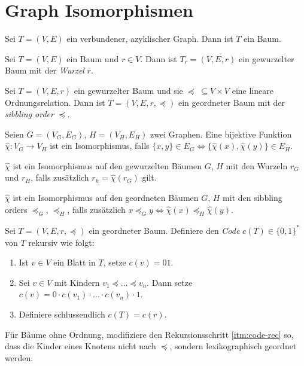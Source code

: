 \chapter{Graph Isomorphismen}

\begin{definition}[Baum]
    Sei $ T = (V, E) $ ein verbundener, azyklischer Graph.
    Dann ist $ T $ ein Baum.
\end{definition}

\begin{definition}
    Sei $ T = (V, E) $ ein Baum und $ r \in V $.
    Dann ist $ T_r = (V, E, r) $ ein gewurzelter Baum mit der \textit{Wurzel} $ r $.
\end{definition}

\begin{definition}
    Sei $ T = (V, E, r) $ ein gewurzelter Baum und sie $ \preceq \; \subseteq V \times V $ eine lineare Ordnungsrelation.
    Dann ist $ T = (V, E, r, \preceq) $ ein geordneter Baum mit der \textit{sibbling order} $ \preceq $.
\end{definition}

\begin{definition}
    Seien $ G = (V_G, E_G) $, $ H = (V_H, E_H) $ zwei Graphen.
    Eine bijektive Funktion $ \hat{\chi} : V_G \rightarrow V_H $ ist ein Isomorphismus, falls $ \{ x, y \} \in E_G \Leftrightarrow \{ \hat{\chi}(x), \hat{\chi}(y) \} \in E_H $.

    $ \hat\chi $ ist ein Isomorphismus auf den gewurzelten Bäumen $ G $, $ H $ mit den Wurzeln $ r_G $ und $ r_H $, falls zusätzlich $ r_h = \hat\chi(r_G) $ gilt.

    $ \hat\chi $ ist ein Isomorphismus auf den geordneten Bäumen $ G $, $ H $ mit den sibbling orders $ \preceq_G $, $ \preceq_H $, falls zusätzlich $ x \preceq_G y \Leftrightarrow \hat\chi(x) \preceq_H \hat\chi(y) $.
\end{definition}

\begin{definition}[Codes]
    Sei $ T = (V, E, r, \preceq) $ ein geordneter Baum.
    Definiere den \textit{Code} $ c(T) \in \{ 0, 1 \}^* $ von $ T $ rekursiv wie folgt:
    \begin{enumerate}
        \item Ist $ v \in V $ ein Blatt in $ T $, setze $ c(v) = 01 $.
        \item \label{itm:code-rec}
        Sei $ v \in V $ mit Kindern $ v_1 \preceq \dots \preceq v_n $.
        Dann setze $ c(v) = 0 \cdot c(v_1) \cdot \dots \cdot c(v_n) \cdot 1 $.
        \item Definiere schlussendlich $ c(T) = c(r) $.
    \end{enumerate}

    Für Bäume ohne Ordnung, modifiziere den Rekursionsschritt \ref{itm:code-rec} so, dass die Kinder eines Knotens nicht nach $ \preceq $, sondern lexikographisch geordnet werden.
\end{definition}

